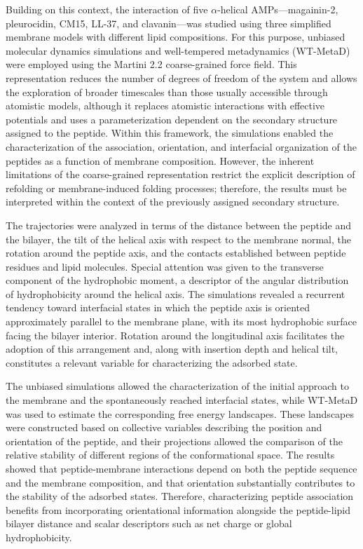 Building on this context, the interaction of five $\alpha$-helical AMPs—magainin-2, pleurocidin, CM15, LL-37, and clavanin—was studied using three simplified membrane models with different lipid compositions. For this purpose, unbiased molecular dynamics simulations and well-tempered metadynamics (WT-MetaD) were employed using the Martini 2.2 coarse-grained force field. This representation reduces the number of degrees of freedom of the system and allows the exploration of broader timescales than those usually accessible through atomistic models, although it replaces atomistic interactions with effective potentials and uses a parameterization dependent on the secondary structure assigned to the peptide. Within this framework, the simulations enabled the characterization of the association, orientation, and interfacial organization of the peptides as a function of membrane composition. However, the inherent limitations of the coarse-grained representation restrict the explicit description of refolding or membrane-induced folding processes; therefore, the results must be interpreted within the context of the previously assigned secondary structure.

The trajectories were analyzed in terms of the distance between the peptide and the bilayer, the tilt of the helical axis with respect to the membrane normal, the rotation around the peptide axis, and the contacts established between peptide residues and lipid molecules. Special attention was given to the transverse component of the hydrophobic moment, a descriptor of the angular distribution of hydrophobicity around the helical axis. The simulations revealed a recurrent tendency toward interfacial states in which the peptide axis is oriented approximately parallel to the membrane plane, with its most hydrophobic surface facing the bilayer interior. Rotation around the longitudinal axis facilitates the adoption of this arrangement and, along with insertion depth and helical tilt, constitutes a relevant variable for characterizing the adsorbed state.

The unbiased simulations allowed the characterization of the initial approach to the membrane and the spontaneously reached interfacial states, while WT-MetaD was used to estimate the corresponding free energy landscapes. These landscapes were constructed based on collective variables describing the position and orientation of the peptide, and their projections allowed the comparison of the relative stability of different regions of the conformational space. The results showed that peptide-membrane interactions depend on both the peptide sequence and the membrane composition, and that orientation substantially contributes to the stability of the adsorbed states. Therefore, characterizing peptide association benefits from incorporating orientational information alongside the peptide-lipid bilayer distance and scalar descriptors such as net charge or global hydrophobicity.

